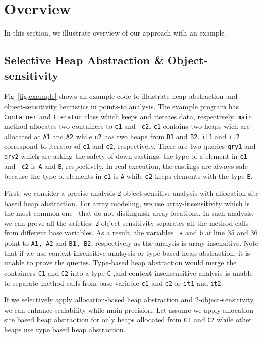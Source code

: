 \clearpage
\section{Overview}
In this section, we illustrate overview of our approach with an example. 

\subsection{Selective Heap Abstraction \& Object-sensitivity}
Fig~\ref{fig:example} shows an example code to illustrate heap
abstraction and object-sensitivity heuristics in points-to analysis.
The example program has {\tt Container} and {\tt Iterator} class which
keeps and iterates data, respectively. 
{\tt main} method allocates two containers to {\tt c1} and {\tt
  c2}. {\tt c1} contains two heaps wich are allocated at {\tt A1} and
{\tt A2} while {\tt c2} has two heaps from {\tt B1} and
{\tt B2}.
{\tt it1} and {\tt it2} correspond to iterator of {\tt c1} and {\tt c2}, respectively.
There are two queries {\tt qry1} and {\tt qry2} which are asking the
safety of down castings; the type of a element in {\tt c1} and {\tt
  c2} is {\tt A} and {\tt B}, respectively. 
In real execution, the castings are always safe because the type of
elements in {\tt c1} is {\tt A} while {\tt c2} keeps elements with the
type {\tt B}. 


First, we consider a precise analysis 2-object-sensitive analysis with
allocation site based heap abstraction. 
For array modeling, we use array-insensitivity which is the most
common one~\cite{Smaragdakis2015} that do not distinguish array
locations. In such analysis, we can prove all the safeties.
2-object-sensitivity separates all the method calls from different
base variables. As a result, the variables {\tt
a} and {\tt b} at line 35 and 36 point to {\tt A1, A2} and {\tt B1,
B2}, respectively as the analysis is array-insensitive. Note that if
we use context-insensitive analsysis or type-based heap abstraction,
it is unable to prove the queries. Type-based heap abstraction
would merge the containers {\tt C1} and {\tt C2} into a type {\tt C}
,and context-insensensitive analysis is unable to separate method calls
from base variable {\tt c1} and {\tt c2} or {\tt it1} and {\tt it2}.


If we selectively apply allocation-based heap abstraction and
2-object-sensitivity, we can enhance scalability while main precision.
Let assume we apply allocation-site based heap abstraction for only
heaps allocated from {\tt C1} and {\tt C2} while other heaps use type
based heap abstraction. 





